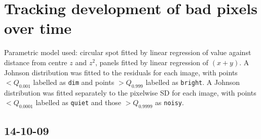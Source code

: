 \documentclass[10pt,fleqn]{article}
\begin{document}



\hrulefill

\section*{Tracking development of bad pixels over time}

Parametric model used: circular spot fitted by linear regression of value against distance from centre $z$ and $z^2$, panels fitted by linear regression of $(x + y)$. A Johnson distribution was fitted to the residuals for each image, with points $< Q_{0.001}$ labelled as \texttt{dim} and points $> Q_{0.999}$ labelled as \texttt{bright}. A Johnson distribution was fitted separately to the pixelwise SD for each image, with points $< Q_{0.0001}$ labelled as \texttt{quiet} and those $> Q_{0.9999}$ as \texttt{noisy}.


\FloatBarrier
\subsection*{14-10-09}
\end{document}
